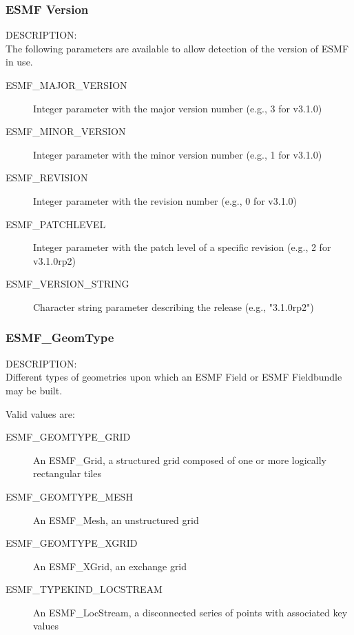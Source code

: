 \subsubsection{ESMF Version}

{\sf DESCRIPTION:\\}
The following parameters are available to allow detection of the
version of ESMF in use.
\begin{description}
\item [ESMF\_MAJOR\_VERSION]
      Integer parameter with the major version number (e.g., 3 for v3.1.0)
\item [ESMF\_MINOR\_VERSION]
      Integer parameter with the minor version number (e.g., 1 for v3.1.0)
\item [ESMF\_REVISION]
      Integer parameter with the revision number (e.g., 0 for v3.1.0)
\item [ESMF\_PATCHLEVEL]
      Integer parameter with the patch level of a specific revision (e.g., 2 for v3.1.0rp2)
\item [ESMF\_VERSION\_STRING]
      Character string parameter describing the release (e.g., "3.1.0rp2")
\end{description}



\subsubsection{ESMF\_GeomType}
\label{opt:geomtype}

{\sf DESCRIPTION:\\}
Different types of geometries upon which an ESMF Field or ESMF Fieldbundle may
be built. 

Valid values are:
\begin{description}
\item [ESMF\_GEOMTYPE\_GRID]
      An ESMF\_Grid, a structured grid composed of one or more logically rectangular tiles
\item [ESMF\_GEOMTYPE\_MESH]
      An ESMF\_Mesh, an unstructured grid
\item [ESMF\_GEOMTYPE\_XGRID]
      An ESMF\_XGrid, an exchange grid
\item [ESMF\_TYPEKIND\_LOCSTREAM]
      An ESMF\_LocStream, a disconnected series of points with associated key values
\end{description}



